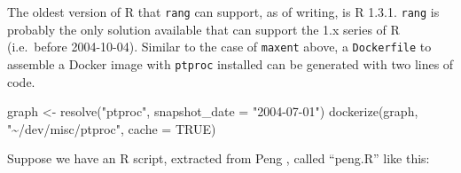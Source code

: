 \documentclass[
  10pt,
  letterpaper,
]{article}
\newenvironment{Shaded}{\begin{snugshade}}{\end{snugshade}}
\newcommand{\AttributeTok}[1]{\textcolor[rgb]{0.40,0.45,0.13}{#1}}
\newcommand{\ConstantTok}[1]{\textcolor[rgb]{0.56,0.35,0.01}{#1}}
\newcommand{\FunctionTok}[1]{\textcolor[rgb]{0.28,0.35,0.67}{#1}}
\newcommand{\NormalTok}[1]{\textcolor[rgb]{0.00,0.23,0.31}{#1}}
\newcommand{\OtherTok}[1]{\textcolor[rgb]{0.00,0.23,0.31}{#1}}
\newcommand{\StringTok}[1]{\textcolor[rgb]{0.13,0.47,0.30}{#1}}
\begin{document}
The oldest version of R that \texttt{rang} can support, as of writing,
is R 1.3.1. \texttt{rang} is probably the only solution available that
can support the 1.x series of R (i.e.~before 2004-10-04). Similar to the
case of \texttt{maxent} above, a \texttt{Dockerfile} to assemble a
Docker image with \texttt{ptproc} installed can be generated with two
lines of code.

\begin{Shaded}
\begin{Highlighting}[]
\NormalTok{graph }\OtherTok{\textless{}{-}} \FunctionTok{resolve}\NormalTok{(}\StringTok{"ptproc"}\NormalTok{, }\AttributeTok{snapshot\_date =} \StringTok{"2004{-}07{-}01"}\NormalTok{)}
\FunctionTok{dockerize}\NormalTok{(graph, }\StringTok{"\textasciitilde{}/dev/misc/ptproc"}\NormalTok{, }\AttributeTok{cache =} \ConstantTok{TRUE}\NormalTok{)}
\end{Highlighting}
\end{Shaded}

Suppose we have an R script, extracted from Peng \citep{peng:2003:MDP},
called ``peng.R'' like this:
\end{document}
